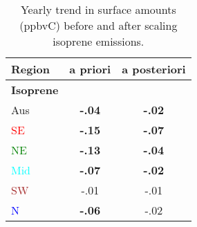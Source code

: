       
      \begin{table}\begin{threeparttable}
        \caption{Yearly trend in surface amounts (ppbvC) before and after scaling isoprene emissions.}
        \begin{tabular}{ l | c  c } 
          \toprule
          Region & a priori & a posteriori \\
          \midrule
          \textbf{Isoprene} & & \\
          Aus                   & \textbf{-.04} & \textbf{-.02}  \\
          \textcolor{red}{SE}   & \textbf{-.15} & \textbf{-.07}  \\
          \textcolor{green}{NE} & \textbf{-.13} & \textbf{-.04}  \\
          \textcolor{cyan}{Mid} & \textbf{-.07} & \textbf{-.02}  \\
          \textcolor{brown}{SW} & -.01      & -.01  \\
          \textcolor{blue}{N}   & \textbf{-.06} & -.02  \\

\end{tabular}
\end{threeparttable}
\end{table}

